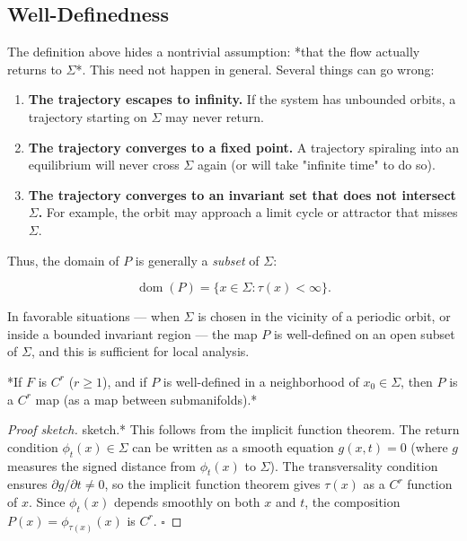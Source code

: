 \subsection{Well-Definedness}\label{sec:4.2.2}

The definition above hides a nontrivial assumption: *that the flow actually returns to $\Sigma$*. This need not happen in general. Several things can go wrong:

\begin{enumerate}[nosep]
  \item \textbf{The trajectory escapes to infinity.} If the system has unbounded orbits, a trajectory starting on $\Sigma$ may never return.

  \item \textbf{The trajectory converges to a fixed point.} A trajectory spiraling into an equilibrium will never cross $\Sigma$ again (or will take "infinite time" to do so).

  \item \textbf{The trajectory converges to an invariant set that does not intersect $\Sigma$.} For example, the orbit may approach a limit cycle or attractor that misses $\Sigma$.
\end{enumerate}

Thus, the domain of $P$ is generally a \textit{subset} of $\Sigma$:

\[
\operatorname{dom}(P) = \{x \in \Sigma : \tau(x) < \infty\}.
\]

In favorable situations --- when $\Sigma$ is chosen in the vicinity of a periodic orbit, or inside a bounded invariant region --- the map $P$ is well-defined on an open subset of $\Sigma$, and this is sufficient for local analysis.

\begin{proposition}\label{prop:4.3.}
*If $F$ is $C^r$ ($r \geq 1$), and if $P$ is well-defined in a neighborhood of $x_0 \in \Sigma$, then $P$ is a $C^r$ map (as a map between submanifolds).*
\end{proposition}


\begin{proof}[Proof sketch]
sketch.* This follows from the implicit function theorem. The return condition $\phi_t(x) \in \Sigma$ can be written as a smooth equation $g(x, t) = 0$ (where $g$ measures the signed distance from $\phi_t(x)$ to $\Sigma$). The transversality condition ensures $\partial g / \partial t \neq 0$, so the implicit function theorem gives $\tau(x)$ as a $C^r$ function of $x$. Since $\phi_t(x)$ depends smoothly on both $x$ and $t$, the composition $P(x) = \phi_{\tau(x)}(x)$ is $C^r$. $\square$

\end{proof}

